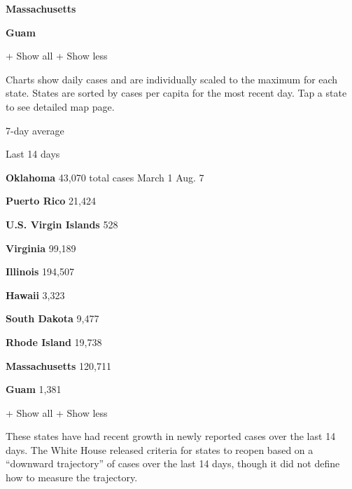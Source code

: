 \href{https://www.nytimes.com/interactive/2020/us/massachusetts-coronavirus-cases.html}{}

\textbf{Massachusetts}

\textbf{Guam}

+ Show all + Show less

Charts show daily cases and are individually scaled to the maximum for
each state. States are sorted by cases per capita for the most recent
day. Tap a state to see detailed map page.

\href{https://www.nytimes.com/interactive/2020/us/oklahoma-coronavirus-cases.html}{}

7-day average

Last 14 days

\textbf{Oklahoma} 43,070 total cases March 1 Aug. 7

\href{https://www.nytimes.com/interactive/2020/us/puerto-rico-coronavirus-cases.html}{}

\textbf{Puerto Rico} 21,424

\textbf{U.S. Virgin Islands} 528

\href{https://www.nytimes.com/interactive/2020/us/virginia-coronavirus-cases.html}{}

\textbf{Virginia} 99,189

\href{https://www.nytimes.com/interactive/2020/us/illinois-coronavirus-cases.html}{}

\textbf{Illinois} 194,507

\href{https://www.nytimes.com/interactive/2020/us/hawaii-coronavirus-cases.html}{}

\textbf{Hawaii} 3,323

\href{https://www.nytimes.com/interactive/2020/us/south-dakota-coronavirus-cases.html}{}

\textbf{South Dakota} 9,477

\href{https://www.nytimes.com/interactive/2020/us/rhode-island-coronavirus-cases.html}{}

\textbf{Rhode Island} 19,738

\href{https://www.nytimes.com/interactive/2020/us/massachusetts-coronavirus-cases.html}{}

\textbf{Massachusetts} 120,711

\textbf{Guam} 1,381

+ Show all + Show less

These states have had recent growth in newly reported cases over the
last 14 days. The White House released criteria for states to reopen
based on a ``downward trajectory'' of cases over the last 14 days,
though it did not define how to measure the trajectory.

